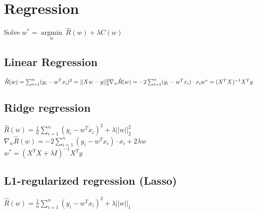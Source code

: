 \section*{Regression}

Solve $w^* = \underset{w}{\operatorname{argmin}} ~ \hat{R}(w)+ \lambda C(w)$

\subsection*{Linear Regression}

$\hat{R}(w) = \sum_{i=1}^n (y_i - w^Tx_i)^2 = ||Xw-y||^2_2\\
\nabla_w \hat{R}(w) = -2 \sum_{i=1}^n (y_i-w^T x_i) \cdot x_i \\
w^* = (X^T X)^{-1} X^T y$


\subsection*{Ridge regression}

$\hat{R}(w) = \frac{1}{n} \sum_{i=1}^n (y_i - w^Tx_i)^2 + \lambda ||w||_2^2$\\
$\nabla_w \hat{R}(w) = -2 \sum_{i=1}^n (y_i-w^T x_i) \cdot x_i + 2 \lambda w$\\
$w^*=(X^T X + \lambda I)^{-1} X^T y$

\subsection*{L1-regularized regression (Lasso)}
$\hat{R}(w) = \frac{1}{n} \sum_{i=1}^n (y_i - w^Tx_i)^2 + \lambda ||w||_1$